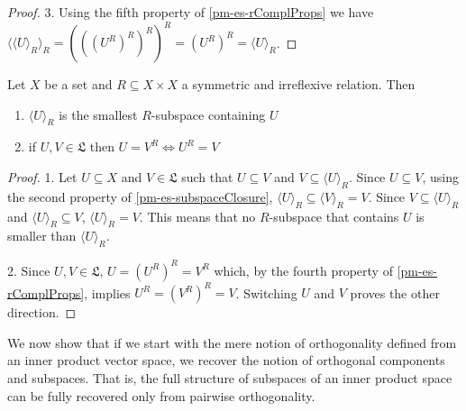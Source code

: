 \begin{mathSection}
\begin{proof}
		3. Using the fifth property of \ref{pm-es-rComplProps} we have $\langle \langle U \rangle_R \rangle_R = (((U^{R})^{R})^{R})^{R} = (U^{R})^{R} = \langle U \rangle_R$.
	\end{proof}
	
	\begin{prop}
		Let $X$ be a set and $R \subseteq X \times X$ a symmetric and irreflexive relation. Then
		\begin{enumerate}
			\item $\langle U \rangle_R$ is the smallest $R$-subspace containing $U$
			\item if $U, V \in \mathfrak{L}$ then $U = V^{R} \iff U^{R} = V$
		\end{enumerate}
	\end{prop}
	
	\begin{proof}
		1. Let $U \subseteq X$ and $V \in \mathfrak{L}$ such that $U \subseteq V$ and $V \subseteq \langle U \rangle_R$. Since $U \subseteq V$, using the second property of \ref{pm-es-subspaceClosure}, $\langle U \rangle_R \subseteq \langle V \rangle_R = V$. Since $V \subseteq \langle U \rangle_R$ and  $\langle U \rangle_R \subseteq  V$, $\langle U \rangle_R = V$. This means that no $R$-subspace that contains $U$ is smaller than $\langle U \rangle_R$.
		
		2. Since $U, V \in \mathfrak{L}$, $U = (U^{R})^{R} = V^{R}$ which, by the fourth property of \ref{pm-es-rComplProps}, implies $U^{R} = (V^{R})^{R} = V$. Switching $U$ and $V$ proves the other direction.
	\end{proof}
\end{mathSection}

We now show that if we start with the mere notion of orthogonality defined from an inner product vector space, we recover the notion of orthogonal components and subspaces. That is, the full structure of subspaces of an inner product space can be fully recovered only from pairwise orthogonality.

